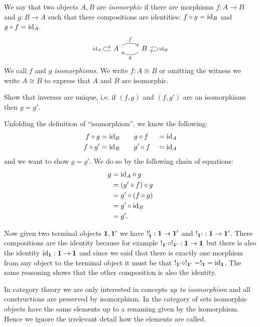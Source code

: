 We say that two objects $A,B$ are \emph{isomorphic} if there are morphisms $f : A \to B$ and $g : B \to A$ such that there compositions are identities: $f \circ g = \mathrm{id}_B$ and $g \circ f = \mathrm{id}_A$. 
\[\begin{tikzcd}
  A \arrow[r, bend left, "f"]  \arrow[loop left,"\id_A"] & B \arrow[l,bend left ,"g"]\arrow[loop right,"\id_B"] 
\end{tikzcd}\]
We call $f$ and $g$ \emph{isomorphisms}. We write $f : A \cong B$ or omitting the witness we write $A \cong B$ to express that $A$ and $B$ are isomorphic. 
\begin{Exercise}
  Show that inverses are unique, i.e. if $(f,g)$ and $(f,g')$ are an isomorphisms then $g = g'$. 
\end{Exercise}
\begin{Answer}
  Unfolding the definition of ``isomorphism'', we know the following:
  \begin{alignat*}{2}
    f\circ g &= \mathrm{id}_B \qquad g\circ f&&=\mathrm{id}_A\\
    f\circ g' &= \mathrm{id}_B \qquad g'\circ f&&=\mathrm{id}_A
  \end{alignat*}
  and we want to show $g=g'$. We do so by the following chain of equations:
  \begin{align*}
    g &= \mathrm{id}_A \circ g \\
      &= (g'\circ f) \circ g\\
      &= g' \circ (f\circ g)\\
      &= g' \circ \mathrm{id}_B\\
      &= g'.
  \end{align*}
\end{Answer}

Now given two terminal objects $\bf{1},\bf{1'}$ we have $!'_{\bf{1}} : \bf{1} \to \bf{1'}$ and $!_{\bf{1'}} : \bf{1} \to \bf{1'}$. There compositions are the identity because for example $!_{\bf{1'}} \circ !_{\bf{1'}} : \bf{1} \to \bf{1}$ but there is also the identity $\mathrm{id}_{\bf{1}} : \bf{1} \to \bf{1}$ and since we said that there is exactly one morphism from any object to the terminal object it must be that $!_{\bf{1'}} \circ !_{\bf{1'}} = !_{\bf{1}} = \mathrm{id}_{\bf{1}}$. The same reasoning shows that the other composition is also the identity.

In category theory we are only interested in concepts \emph{up to isomorphism} and all constructions are preserved by isomorphism. In the category of sets isomorphic objects have the same elements up to a renaming given by the isomorphism. Hence we ignore the irrelevant detail how the elements are called.

